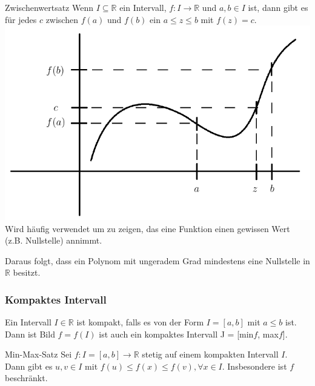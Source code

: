 \documentclass[a4paper,fontsize = 7pt]{scrartcl}
\def\R{\mathbb{R}}
\begin{document}
\begin{mainbox}{Zwischenwertsatz}
  \vspace{-4pt}
 Wenn $I \subseteq \R$ ein Intervall, $f: I \to \R$ und $a, b \in I$ ist, dann gibt es für jedes $c$ zwischen $f(a)$ und $f(b)$ ein $a \le z \le b$ mit $f(z) = c$.
 \includegraphics[width=\linewidth]{zwischenwertsatz.png}
 Wird häufig verwendet um zu zeigen, das eine Funktion einen gewissen Wert (z.B. Nullstelle) annimmt.
 \vspace{-4pt}
\end{mainbox}
Daraus folgt, dass ein Polynom mit ungeradem Grad mindestens eine Nullstelle in $\R$ besitzt.

\subsubsection{Kompaktes Intervall}
Ein Intervall $I \in \R$ ist kompakt, falls es von der Form $I = [a,b]$ mit $a \le b$ ist.
Dann ist Bild $f = f(I)$ ist auch ein kompaktes Intervall J = [min$f$, max$f$].

\begin{mainbox}{Min-Max-Satz}
  \vspace{-4pt}
 Sei $f: I = [a,b] \to \R$ stetig auf einem kompakten Intervall $I$. Dann gibt es $u, v \in I$ mit $f(u) \le f(x) \le f(v), \forall x \in I$. Insbesondere ist $f$ beschränkt.
 \vspace{-4pt}
\end{mainbox}

\end{document}
